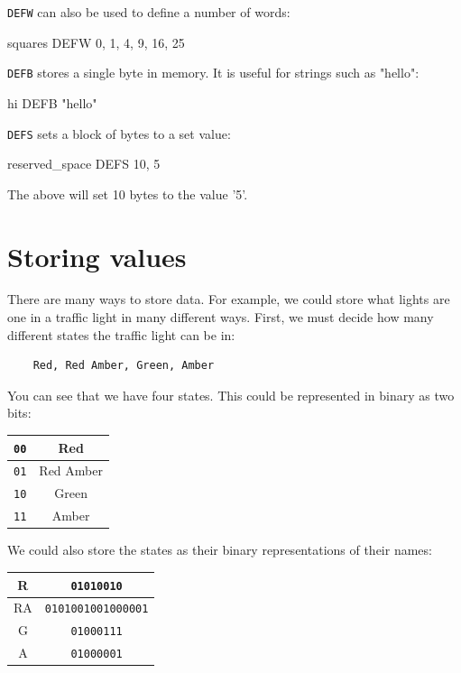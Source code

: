 \documentclass{article}
\begin{document}
{\tt DEFW} can also be used to define a number of words:

\begin{listing}{1}
squares	DEFW	0, 1, 4, 9, 16, 25
\end{listing}

{\tt DEFB} stores a single byte in memory. It is useful for strings such as "hello":

\begin{listing}{1}
hi	DEFB	"hello"
\end{listing}

{\tt DEFS} sets a block of bytes to a set value:

\begin{listing}{1}
reserved_space	DEFS	10, 5
\end{listing}

The above will set 10 bytes to the value '5'.

\section{Storing values}


There are many ways to store data. For example, we could store what lights are
one in a traffic light in many different ways. First, we must decide how many
different states the traffic light can be in:

\begin{verbatim}
	Red, Red Amber, Green, Amber
\end{verbatim}

You can see that we have four states. This could be represented in binary as two
bits:

\begin{tabular}{|c|c|}
	\hline
	{\tt 00} & Red\\ \hline
	{\tt 01} & Red Amber\\ \hline
	{\tt 10} & Green\\ \hline
	{\tt 11} & Amber\\ \hline
\end{tabular}

We could also store the states as their binary representations of their names:

\begin{tabular}{|c|c|}
	\hline
	R & {\tt 01010010}\\ \hline
	RA & {\tt 0101001001000001}\\ \hline
	G & {\tt 01000111}\\ \hline
	A & {\tt 01000001}\\ \hline
\end{tabular}
\end{document}
